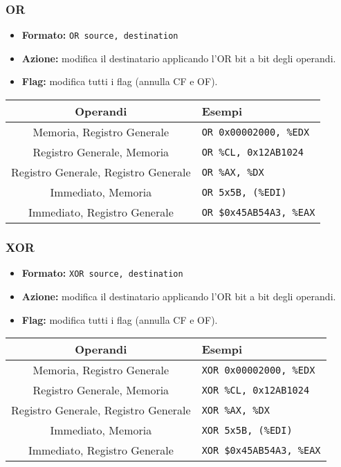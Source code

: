 \documentclass[a4paper,11pt]{article}
\begin{document}
\subsubsection{OR}
\begin{itemize}
	\item \textbf{Formato:} \texttt{OR source, destination}
	\item \textbf{Azione:} modifica il destinatario applicando l'OR bit a bit degli operandi. 
	\item \textbf{Flag:} modifica tutti i flag (annulla CF e OF).
\end{itemize}

		\begin{table}[H]
		\center {}
			\begin{tabular} { c | p{5cm} }
				\bfseries Operandi & \bfseries Esempi \\
				\hline
				Memoria, Registro Generale & \texttt{OR 0x00002000, \%EDX} \\ 
				Registro Generale, Memoria & \texttt{OR \%CL, 0x12AB1024} \\ 
				Registro Generale, Registro Generale & \texttt{OR \%AX, \%DX} \\ 
				Immediato, Memoria & \texttt{OR 5x5B, (\%EDI)} \\ 
				Immediato, Registro Generale & \texttt{OR \$0x45AB54A3, \%EAX}
			\end{tabular}
		\end{table}

\subsubsection{XOR}
\begin{itemize}
	\item \textbf{Formato:} \texttt{XOR source, destination}
	\item \textbf{Azione:} modifica il destinatario applicando l'OR bit a bit degli operandi. 
	\item \textbf{Flag:} modifica tutti i flag (annulla CF e OF).
\end{itemize}

		\begin{table}[H]
		\center {}
			\begin{tabular} { c | p{5cm} }
				\bfseries Operandi & \bfseries Esempi \\
				\hline
				Memoria, Registro Generale & \texttt{XOR 0x00002000, \%EDX} \\ 
				Registro Generale, Memoria & \texttt{XOR \%CL, 0x12AB1024} \\ 
				Registro Generale, Registro Generale & \texttt{XOR \%AX, \%DX} \\ 
				Immediato, Memoria & \texttt{XOR 5x5B, (\%EDI)} \\ 
				Immediato, Registro Generale & \texttt{XOR \$0x45AB54A3, \%EAX}
			\end{tabular}
		\end{table}
\end{document}
